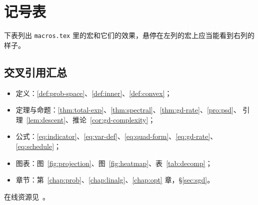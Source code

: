 \chapter{记号表}\label{chap:notation}

下表列出 \texttt{macros.tex} 里的宏和它们的效果，悬停在左列的宏上应当能看到右列的样子。



\section{交叉引用汇总}\label{sec:xref}

\begin{itemize}
  \item 定义：\ref{def:prob-space}、\ref{def:inner}、\ref{def:convex}；
  \item 定理与命题：\ref{thm:total-exp}、\ref{thm:spectral}、\ref{thm:gd-rate}、\ref{pro:psd}、
    引理~\ref{lem:descent}、推论~\ref{cor:gd-complexity}；
  \item 公式：\eqref{eq:indicator}、\eqref{eq:var-def}、\eqref{eq:quad-form}、\eqref{eq:gd-rate}、
    \eqref{eq:schedule}；
  \item 图表：图~\ref{fig:projection}、图~\ref{fig:heatmap}、表~\ref{tab:decomp}；
  \item 章节：第~\ref{chap:prob}、\ref{chap:linalg}、\ref{chap:opt} 章，\S\ref{sec:sgd}。
\end{itemize}

在线资源见~\cite{demo2024web}。
